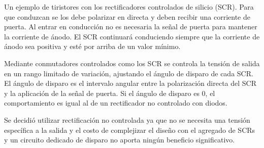 Un ejemplo de tiristores con los rectificadores controlados de silicio (SCR).
Para que conduzcan se los debe polarizar en directa y deben recibir una corriente de puerta. 
Al entrar en conducción no es necesaria la señal de puerta para mantener la corriente de ánodo. 
El SCR continuará conduciendo siempre que la corriente de ánodo sea positiva y esté por arriba de un valor mínimo. 

Mediante conmutadores controlados como los SCR se controla la tensión de salida en un rango limitado de variación, ajustando el ángulo de disparo de cada SCR. 
El ángulo de disparo es el intervalo angular entre la polarización directa del SCR y la aplicación de la señal de puerta. 
Si el ángulo de disparo es 0, el comportamiento es igual al de un rectificador no controlado con diodos. 

Se decidió utilizar rectificación no controlada ya que no se necesita una tensión específica a la salida
y el costo de complejizar el diseño con el agregado de SCRs y un circuito dedicado de disparo no aporta ningún beneficio significativo.






